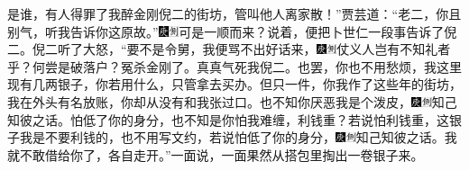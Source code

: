 是谁，有人得罪了我醉金刚倪二的街坊，管叫他人离家散！''贾芸道：``老二，你且别气，听我告诉你这原故。''{\includegraphics[width=3mm]{../Images/00004}\includegraphics[width=3mm]{../Images/00011}\footnotesize \kaishu 可是一顺而来？}说着，便把卜世仁一段事告诉了倪二。倪二听了大怒，``要不是令舅，我便骂不出好话来，{\includegraphics[width=3mm]{../Images/00004}\includegraphics[width=3mm]{../Images/00011}\footnotesize \kaishu 仗义人岂有不知礼者乎？何尝是破落户？冤杀金刚了。}真真气死我倪二。也罢，你也不用愁烦，我这里现有几两银子，你若用什么，只管拿去买办。但只一件，你我作了这些年的街坊，我在外头有名放账，你却从没有和我张过口。也不知你厌恶我是个泼皮，{\includegraphics[width=3mm]{../Images/00004}\includegraphics[width=3mm]{../Images/00011}\footnotesize \kaishu 知己知彼之话。}怕低了你的身分，也不知是你怕我难缠，利钱重？若说怕利钱重，这银子我是不要利钱的，也不用写文约，若说怕低了你的身分，{\includegraphics[width=3mm]{../Images/00004}\includegraphics[width=3mm]{../Images/00011}\footnotesize \kaishu 知己知彼之话。}我就不敢借给你了，各自走开。''一面说，一面果然从搭包里掏出一卷银子来。

